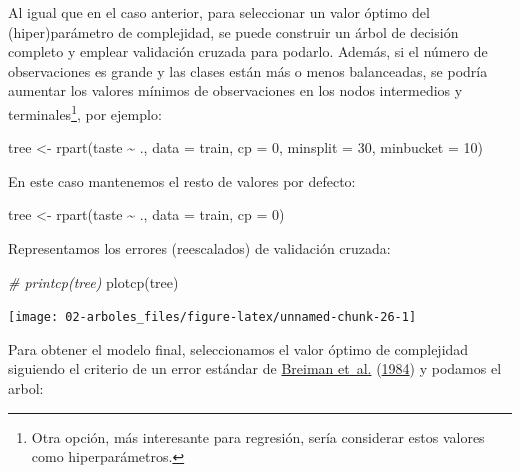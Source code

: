\documentclass[
  spanish,
]{book}
\newenvironment{Shaded}{\begin{snugshade}}{\end{snugshade}}
\newcommand{\AttributeTok}[1]{\textcolor[rgb]{0.77,0.63,0.00}{#1}}
\newcommand{\CommentTok}[1]{\textcolor[rgb]{0.56,0.35,0.01}{\textit{#1}}}
\newcommand{\DecValTok}[1]{\textcolor[rgb]{0.00,0.00,0.81}{#1}}
\newcommand{\FunctionTok}[1]{\textcolor[rgb]{0.00,0.00,0.00}{#1}}
\newcommand{\NormalTok}[1]{#1}
\newcommand{\OtherTok}[1]{\textcolor[rgb]{0.56,0.35,0.01}{#1}}
\newcommand{\SpecialCharTok}[1]{\textcolor[rgb]{0.00,0.00,0.00}{#1}}
\theoremstyle{break}
\theoremstyle{definition}
\theoremstyle{definition}
\theoremstyle{definition}
\theoremstyle{definition}
\theoremstyle{remark}
\begin{document}
Al igual que en el caso anterior, para seleccionar un valor óptimo del (hiper)parámetro de complejidad, se puede construir un árbol de decisión completo y emplear validación cruzada para podarlo.
Además, si el número de observaciones es grande y las clases están más o menos balanceadas,
se podría aumentar los valores mínimos de observaciones en los nodos intermedios y terminales\footnote{Otra opción, más interesante para regresión, sería considerar estos valores como hiperparámetros.}, por ejemplo:

\begin{Shaded}
\begin{Highlighting}[]
\NormalTok{tree }\OtherTok{\textless{}{-}} \FunctionTok{rpart}\NormalTok{(taste }\SpecialCharTok{\textasciitilde{}}\NormalTok{ ., }\AttributeTok{data =}\NormalTok{ train, }\AttributeTok{cp =} \DecValTok{0}\NormalTok{, }\AttributeTok{minsplit =} \DecValTok{30}\NormalTok{, }\AttributeTok{minbucket =} \DecValTok{10}\NormalTok{)}
\end{Highlighting}
\end{Shaded}

En este caso mantenemos el resto de valores por defecto:

\begin{Shaded}
\begin{Highlighting}[]
\NormalTok{tree }\OtherTok{\textless{}{-}} \FunctionTok{rpart}\NormalTok{(taste }\SpecialCharTok{\textasciitilde{}}\NormalTok{ ., }\AttributeTok{data =}\NormalTok{ train, }\AttributeTok{cp =} \DecValTok{0}\NormalTok{)}
\end{Highlighting}
\end{Shaded}

Representamos los errores (reescalados) de validación cruzada:

\begin{Shaded}
\begin{Highlighting}[]
\CommentTok{\# printcp(tree)}
\FunctionTok{plotcp}\NormalTok{(tree)}
\end{Highlighting}
\end{Shaded}

\begin{center}\texttt{[image: 02-arboles\_files/figure-latex/unnamed-chunk-26-1]} \end{center}

Para obtener el modelo final, seleccionamos el valor óptimo de complejidad siguiendo el criterio de un error estándar de \protect\hyperlink{ref-breiman1984classification}{Breiman et~al.} (\protect\hyperlink{ref-breiman1984classification}{1984}) y podamos el arbol:
\end{document}
